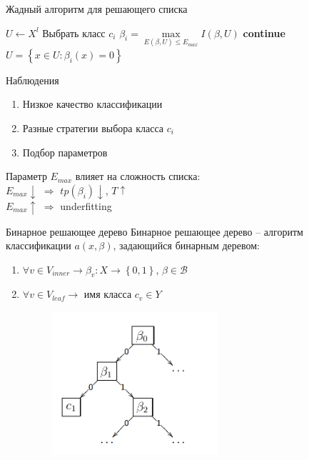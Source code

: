 \documentclass[10pt]{beamer}
\begin{document}
\begin{frame}{Жадный алгоритм для решающего списка}
  \begin{algorithmic}[1]
      \State $U \gets X^l$
	      \State Выбрать класс $c_i$
	      \State $\beta_i = \max\limits_{E(\beta, U) \leq E_{max}} I(\beta, U)$
	        \State \textbf{continue}
	      \EndIf
	      \State $U = \left\{ x \in U: \beta_i(x) = 0 \right\}$
	        \Return
	      \EndIf
      \EndFor
    \EndFunction
  \end{algorithmic}    
\end{frame}

\begin{frame}{Наблюдения}
	\begin{enumerate}[--]
	\item Низкое качество классификации
	\item Разные стратегии выбора класса $c_i$
	\item Подбор параметров
	\end{enumerate}
	\bigbreak
	\pause
	Параметр $E_{max}$ влияет на сложность списка:\\
	$E_{max} \downarrow$ $\Rightarrow$ $tp(\beta_i) \downarrow$, $T \uparrow$\\
	$E_{max} \uparrow$ $\Rightarrow$ underfitting
\end{frame}


\begin{frame}{Бинарное решающее дерево}
	Бинарное решающее дерево -- алгоритм классификации $a(x, \beta)$, задающийся бинарным деревом:\\
	\begin{enumerate}[--]
	\item $\forall v \in V_{inner} \rightarrow \beta_v: X \rightarrow \left\{ 0,1\right\}$, $\beta \in \mathcal{B}$
	\item $\forall v \in V_{leaf} \rightarrow $ имя класса $c_v \in Y$\\
	
	\begin{figure}[htbp]
	  \includegraphics[height=150pt, keepaspectratio = true]{images/binary_tree}   
	\end{figure}
	\end{enumerate}
\end{frame}
\end{document}
